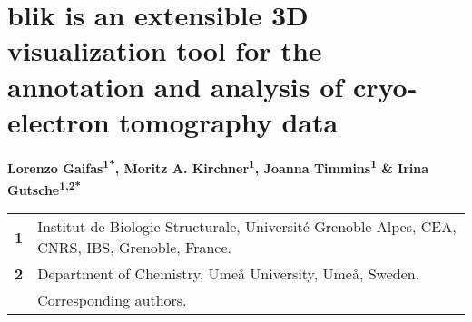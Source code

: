 \section*{blik is an extensible 3D visualization tool for the annotation and analysis of cryo-electron tomography data} %

\textbf{
Lorenzo Gaifas\textsuperscript{1*},
Moritz A. Kirchner\textsuperscript{1},
Joanna Timmins\textsuperscript{1} \&
Irina Gutsche\textsuperscript{1,2*}
}

\begin{singlespace}
\begin{scriptsize}
\raggedright
\begin{tabularx}{\linewidth}{>{\bfseries}l X}
1 & Institut de Biologie Structurale, Université Grenoble Alpes, CEA, CNRS, IBS, Grenoble, France. \\
2 & Department of Chemistry, Umeå University, Umeå, Sweden. \\
* & Corresponding authors. \\
\end{tabularx}
\end{scriptsize}
\end{singlespace}


